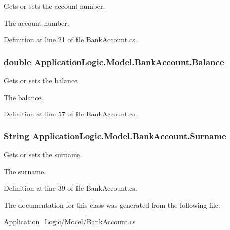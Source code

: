 Gets or sets the account number. 

The account number.

Definition at line 21 of file BankAccount.cs.

\hypertarget{class_application_logic_1_1_model_1_1_bank_account_a2630c3acc72bcd9b64ed86ac1cbeb7d0}{
\subsubsection[{Balance}]{\setlength{\rightskip}{0pt plus 5cm}double ApplicationLogic.Model.BankAccount.Balance}}
\label{class_application_logic_1_1_model_1_1_bank_account_a2630c3acc72bcd9b64ed86ac1cbeb7d0}


Gets or sets the balance. 

The balance.

Definition at line 57 of file BankAccount.cs.

\hypertarget{class_application_logic_1_1_model_1_1_bank_account_a3e8b76df7ceea3650f4dff4be49c5997}{
\subsubsection[{Surname}]{\setlength{\rightskip}{0pt plus 5cm}String ApplicationLogic.Model.BankAccount.Surname}}
\label{class_application_logic_1_1_model_1_1_bank_account_a3e8b76df7ceea3650f4dff4be49c5997}


Gets or sets the surname. 

The surname.

Definition at line 39 of file BankAccount.cs.



The documentation for this class was generated from the following file:\begin{DoxyCompactItemize}
\item 
Application\_\-Logic/Model/BankAccount.cs\end{DoxyCompactItemize}

